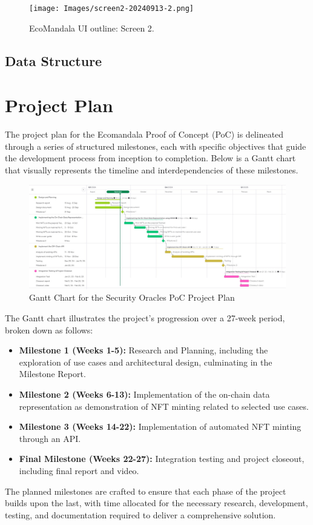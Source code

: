 \documentclass{scrreport}
\begin{document}
\begin{figure}[H]
\centering
\texttt{[image: Images/screen2-20240913-2.png]}
\caption{EcoMandala UI outline: Screen 2.}
\label{fig:ui-screen-2}
\end{figure}

\newpage
\subsection{Data Structure}


\newpage


\section{Project Plan}

The project plan for the Ecomandala Proof of Concept (PoC) is delineated through a series of structured milestones, 
each with specific objectives that guide the development process from inception to completion. Below is a Gantt chart that visually 
represents the timeline and interdependencies of these milestones.

\begin{figure}[H]
\centering
\includegraphics[width=\linewidth]{Images/Ecomandala - Project Plan .jpg}
\caption{Gantt Chart for the Security Oracles PoC Project Plan}
\label{fig:gantt_chart}
\end{figure}

The Gantt chart illustrates the project's progression over a 27-week period, broken down as follows:

\begin{itemize}
  \item \textbf{Milestone 1 (Weeks 1-5):} Research and Planning, including the exploration of use cases and architectural design, culminating in the Milestone Report.
  \item \textbf{Milestone 2 (Weeks 6-13):} Implementation of the on-chain data representation as demonstration of NFT minting related to selected use cases.
  \item \textbf{Milestone 3 (Weeks 14-22):} Implementation of automated NFT minting through an API.
  \item \textbf{Final Milestone (Weeks 22-27):} Integration testing and project closeout, including final report and video.
\end{itemize}

The planned milestones are crafted to ensure that each phase of the project builds upon the last, with time allocated for the necessary research, development, testing, and documentation required to deliver a comprehensive solution.
\end{document}
